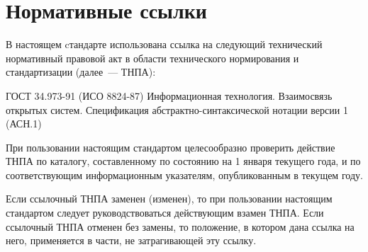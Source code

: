\chapter{Нормативные ссылки}

В настоящем cтандарте использована ссылка на следующий технический нормативный 
правовой акт в области технического нормирования и стандартизации (далее~--- \mbox{ТНПА}):

ГОСТ 34.973-91 (ИСО 8824-87) Информационная технология. Взаимосвязь
открытых систем. Спецификация абстрактно-синтаксической нотации
версии 1 (АСН.1)

\begin{note*}
При пользовании настоящим стандартом целесообразно проверить
действие ТНПА по каталогу, составленному по
состоянию на 1 января текущего года, и по соответствующим информационным
указателям, опубликованным в текущем году.

Если ссылочный ТНПА заменен (изменен), то при пользовании настоящим стандартом
следует руководствоваться действующим взамен ТНПА. Если ссылочный ТНПА
отменен без замены, то положение, в котором дана ссылка на него, применяется в
части, не затрагивающей эту ссылку.
\end{note*}
